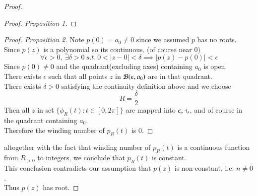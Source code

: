 \documentclass[11pt]{article}
\begin{document}
\begin{proof}
\begin{proof}[Proof. Proposition 1]
			\end{proof}
			\begin{proof}[Proof. Proposition 2]
				Note $p(0) = a_0 \neq 0$ since we assumed $p$ has no roots. \\
				Since $p(z)$ is a polynomial so its continuous. (of course near $0$) \\
				\[
					\forall \epsilon > 0,\ \exists \delta > 0\ s.t.\ 0 < |z - 0| < \delta \implies |p(z) - p(0)| < \epsilon 
				\]
				Since $p(0) \neq 0$ and the quadrant(excluding axes) containing $a_0$ is open.\\
				There exists $\epsilon$ such that all points $z$ in $\mathcal{{B}}(\epsilon, a_0)$ are in that quadrant. \\
				There exists $\delta > 0$ satisfying the continuity definition above and we choose 
				\[
					R = \frac{\delta}{2}
				\]
				Then all $z$ in set $\{\phi_R(t):t\in [0, 2\pi]\}$ are mapped into $\mathcal{{\epsilon, a_0}}$, and of course in the quadrant containing $a_0$.\\
				Therefore the winding number of $p_R(t)$ is 0.
			\end{proof}
			altogether with the fact that winding number of $p_R(t)$ is a continuous function from $R_{>0}$ to integers, we conclude that $p_R(t)$ is constant. \\
			This conclusion contradicts our assumption that $p(z)$ is non-constant, i.e. $n \neq 0$. \\
			Thus $p(z)$ has root.
		\end{proof}
		
\end{document}
